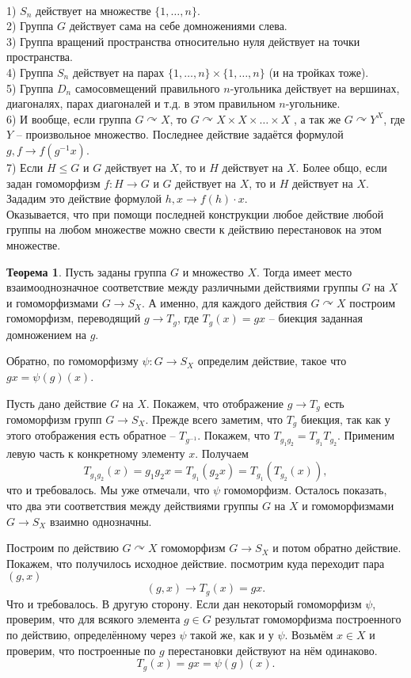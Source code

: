 \documentclass[10pt,a4paper,oneside]{book}
\theoremstyle{definition}
\newtheorem{thm}{\color{red!40!black}Теорема}
\renewcommand{\leq}{\leqslant}
\def\exm{\noindent {\bf Примеры:}}
\def\thrm{\begin{thm}}
\def\ethrm{\end{thm}}
\begin{document}
\exm \\
1) $S_n$ действует на множестве $\{1,\dots,n\}$.\\
2) Группа $G$ действует сама на себе домножениями слева.\\
3) Группа вращений пространства относительно нуля действует на точки пространства.\\
4) Группа $S_n$ действует на парах $\{1,\dots,n\}\times \{1,\dots,n\}$ (и на тройках тоже).\\
5) Группа $D_n$ самосовмещений правильного $n$-угольника действует на вершинах, диагоналях, парах диагоналей и т.д. в этом правильном $n$-угольнике.\\
6) И вообще, если группа $G\curvearrowright X$, то $G \curvearrowright X\times X\times \dots \times X$ , а так же $G \curvearrowright Y^X$, где $Y$ -- произвольное множество. Последнее действие задаётся формулой $g,f \to f(g^{-1}x)$.\\
7) Если $H\leq G$ и $G$ действует на $X$, то и $H$ действует на $X$. Более общо, если задан гомоморфизм $f\colon H \to G$ и $G$ действует на $X$, то и $H$ действует на $X$. Зададим это действие формулой $h,x \to f(h)\cdot x$.\\

Оказывается, что при помощи последней конструкции любое действие любой группы на любом множестве можно свести к действию перестановок на этом множестве.


\thrm
Пусть заданы группа $G$ и множество $X$. Тогда имеет место взаимооднозначное соответствие между различными действиями группы $G$ на $X$ и  гомоморфизмами $G \to S_X$. А именно, для каждого действия $G \curvearrowright X$ построим гомоморфизм, переводящий $g \to T_g$, где $T_g(x)=gx$ -- биекция заданная домножением на $g$. 

Обратно, по гомоморфизму $\psi \colon G \to S_X$ определим действие, такое что $gx=\psi(g)(x)$.
\ethrm
\proof
Пусть дано действие $G$ на $X$. Покажем, что отображение $g \to T_g$ есть гомоморфизм групп $G \to S_X$.  Прежде всего заметим, что $T_g$ биекция, так как у этого отображения есть обратное -- $T_{g^{-1}}$. 
Покажем, что $T_{g_1g_2}=T_{g_1}T_{g_2}$. Применим  левую часть к конкретному элементу $x$. Получаем $$T_{g_1g_2}(x)=g_1g_2x=T_{g_1}(g_2x)=T_{g_1}(T_{g_2}(x)),$$
что и требовалось. Мы уже отмечали, что $\psi$ гомоморфизм. Осталось показать, что два эти соответствия между действиями группы $G$ на $X$ и гомоморфизмами $G \to S_X$ взаимно однозначны. 

Построим по действию $G \curvearrowright X$ гомоморфизм $G \to S_X$ и потом обратно действие. Покажем, что получилось исходное действие. посмотрим куда переходит пара $(g,x)$
$$(g,x) \to T_g(x)=gx.$$
Что и требовалось. В другую сторону. Если дан некоторый гомоморфизм $\psi$, проверим, что для всякого элемента $g\in G$ результат гомоморфизма построенного по действию, определённому через $\psi$ такой же, как и у $\psi$. Возьмём $x\in X$ и проверим, что построенные по $g$ перестановки действуют на нём одинаково. 
$$T_g(x)=gx=\psi(g)(x).$$
\endproof
\end{document}
